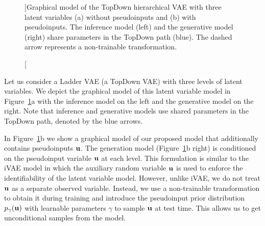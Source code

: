 \begin{figure}[t]
{}
    \caption[][\baselineskip]{Graphical model of the TopDown hierarchical VAE with three latent variables (a) without pseudoinputs and (b) with pseudoinputs. The inference model (left) and the generative model (right) share parameters in the TopDown path (blue). The dashed arrow represents a non-trainable transformation.}
    \label{fig:dct_vae_graph_model}
\vskip 15pt
\end{figure}

Let us consider a Ladder VAE (a TopDown VAE) with three levels of latent variables. We depict the graphical model of this latent variable model in Figure~\ref{fig:dct_vae_graph_model}a with the inference model on the left and the generative model on the right. Note that inference and generative models use shared parameters in the TopDown path, denoted by the blue arrows. 

In Figure~\ref{fig:dct_vae_graph_model}b we show a graphical model of our proposed model that additionally contains pseudoinputs ${\mathbf{u}}$.
The generation model (Figure~\ref{fig:dct_vae_graph_model}b right) is conditioned on the pseudoinput variable ${\mathbf{u}}$ at each level. 
This formulation is similar to the iVAE model \citep{khemakhem2020variational} in which the auxiliary random variable ${\mathbf{u}} $ is used to enforce the identifiability of the latent variable model. 
However, unlike iVAE, we do not treat ${\mathbf{u}}$ as a separate observed variable. Instead, we use a non-trainable transformation to obtain it during training and introduce the pseudoinput prior distribution $p_{\gamma}({\mathbf{u}})$ with learnable parameters $\gamma$ to sample ${\mathbf{u}}$ at test time. 
This allows us to get unconditional samples from the model.

